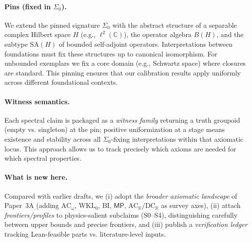 \documentclass[11pt]{article}
\newcommand{\MP}{\mathsf{MP}}
\theoremstyle{plain}
\theoremstyle{definition}
\theoremstyle{remark}
\newcommand{\C}{\mathbb{C}}
\newcommand{\ACw}{\mathrm{AC}_\omega}
\newcommand{\ACR}{\mathrm{AC}_{\mathbb{R}}}
\newcommand{\DCR}{\mathrm{DC}_{\mathbb{R}}}
\newcommand{\WKLz}{\mathrm{WKL}_0}
\newcommand{\BI}{\mathrm{BI}}
\newcommand{\SigmaZero}{\Sigma_{0}}
\begin{document}
\paragraph{Pins (fixed in $\SigmaZero$).}
We extend the pinned signature $\SigmaZero$ with the abstract structure of a separable complex Hilbert space $H$ (e.g., $\ell^2(\C)$), the operator algebra $B(H)$,
and the subtype $\mathrm{SA}(H)$ of bounded self-adjoint operators. Interpretations between foundations must fix these structures up to canonical isomorphism. For unbounded exemplars we fix a
core domain (e.g., Schwartz space) where closures are standard. This pinning ensures that our calibration results apply uniformly across different foundational contexts.

\paragraph{Witness semantics.}
Each spectral claim is packaged as a \emph{witness family} returning a truth groupoid (empty vs. singleton)
at the pin; positive uniformization at a stage means existence and stability across all $\SigmaZero$-fixing interpretations within that axiomatic locus.
This approach allows us to track precisely which axioms are needed for which spectral properties.

\paragraph{What is new here.}
Compared with earlier drafts, we (i) adopt the \emph{broader axiomatic landscape} of Paper~3A (adding $\ACw$, $\WKLz$, $\BI$, $\MP$, $\ACR/\DCR$ as survey axes), (ii) attach \emph{frontiers/profiles} to physics-salient subclaims (S0--S4), distinguishing carefully between upper bounds and precise frontiers, and (iii) publish a \emph{verification ledger} tracking Lean-feasible parts vs. literature-level inputs.
\end{document}
